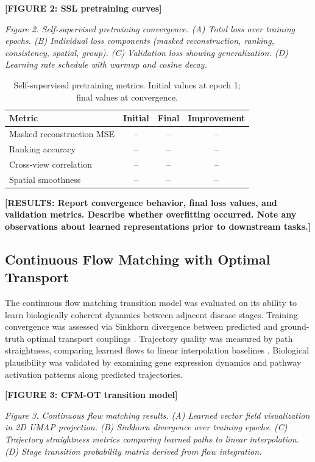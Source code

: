 \textbf{[FIGURE 2: SSL pretraining curves]}

\textit{Figure 2. Self-supervised pretraining convergence. (A) Total loss over training epochs. (B) Individual loss components (masked reconstruction, ranking, consistency, spatial, group). (C) Validation loss showing generalization. (D) Learning rate schedule with warmup and cosine decay.}

\begin{table}[h]
\centering
\caption{Self-supervised pretraining metrics. Initial values at epoch 1; final values at convergence.}
\label{tab:ssl_metrics}
\begin{tabular}{lccc}
\toprule
\textbf{Metric} & \textbf{Initial} & \textbf{Final} & \textbf{Improvement} \\
\midrule
Masked reconstruction MSE & -- & -- & -- \\
Ranking accuracy & -- & -- & -- \\
Cross-view correlation & -- & -- & -- \\
Spatial smoothness & -- & -- & -- \\
\bottomrule
\end{tabular}
\end{table}

\textbf{[RESULTS: Report convergence behavior, final loss values, and validation metrics. Describe whether overfitting occurred. Note any observations about learned representations prior to downstream tasks.]}


\subsection{Continuous Flow Matching with Optimal Transport}

The continuous flow matching transition model was evaluated on its ability to learn biologically coherent dynamics between adjacent disease stages. Training convergence was assessed via Sinkhorn divergence between predicted and ground-truth optimal transport couplings \cite{Cuturi2013-li}. Trajectory quality was measured by path straightness, comparing learned flows to linear interpolation baselines \cite{Lipman2022-ns}. Biological plausibility was validated by examining gene expression dynamics and pathway activation patterns along predicted trajectories.

\textbf{[FIGURE 3: CFM-OT transition model]}

\textit{Figure 3. Continuous flow matching results. (A) Learned vector field visualization in 2D UMAP projection. (B) Sinkhorn divergence over training epochs. (C) Trajectory straightness metrics comparing learned paths to linear interpolation. (D) Stage transition probability matrix derived from flow integration.}

